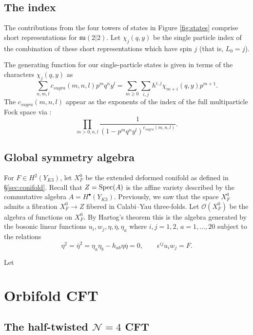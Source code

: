 \documentclass[11pt]{amsart}
\newcommand{\eps}{\epsilon}
\newcommand{\br}{\overline}
\newcommand{\mc}{\mathcal}
\def\eps{{\epsilon}}
\def\bu{{\bullet}}
\def\cO{\mc O}
\def\lie#1{\ensuremath{\mathfrak{#1}}}
\def\beqn{\begin{equation}}
\def\eeqn{\end{equation}}
\theoremstyle{thm}
\numberwithin{equation}{subsection}
\theoremstyle{def}
\theoremstyle{rem}
\begin{document}
\subsection{The index} 

The contributions from the four towers of states in Figure \ref{fig:states} comprise short representations for $\lie{su}(2|2)$. 
Let $\chi_j (q,y)$ be the single particle index of the combination of these short representations which have spin $j$ (that is, $L_0 = j$). 

The generating function for our single-particle states is given in terms of the characters $\chi_j(q,y)$ as 
\beqn
\sum_{n,m,l} c_{sugra}(m,n,l) p^m q^n y^l = \sum_{m \geq 0} \sum_{i,j} h^{i,j} \chi_{m+i} (q,y) p^{m+1} .
\eeqn
The $c_{sugra}(m,n,l)$ appear as the exponents of the index of the full multiparticle Fock space via \cite{dB2, dmvv}:
\beqn
\prod_{m> 0, n,l} \frac{1}{(1-p^mq^ny^l)^{c_{sugra}(m,n,l)}} .
\eeqn 

\subsection{Global symmetry algebra}
For $F \in H^2(Y_{K3})$, let $X^0_F$ be the extended deformed conifold as defined in \S \ref{sec:conifold}.
Recall that $Z = {\rm Spec}(A)$ is the affine variety described by the commutative algebra $A = H^\bu(Y_{K3})$. 
Previously, we saw that the space $X_F^0$ admits a fibration $X^0_F \to Z$ fibered in Calabi--Yau three-folds. 
Let $\cO(X^0_F)$ be the algebra of functions on $X^0_F$.
By Hartog's theorem this is the algebra generated by the bosonic linear functions $u_i, w_j, \eta, \br \eta, \eta_a$ where $i,j=1,2$, $a=1,\ldots, 20$ subject to the relations
\[
\eta^2 = \br \eta^2 = \eta_a \eta_b - h_{ab} \eta \br \eta = 0, \qquad \eps^{ij} u_i w_j = F . 
\]

Let 

\section{Orbifold CFT}

\subsection{The half-twisted $\mc N=4$ CFT}
\end{document}
